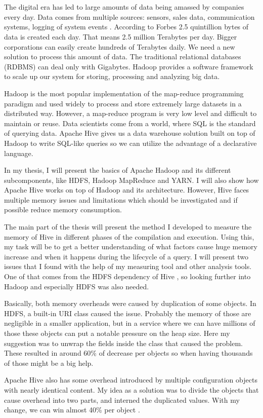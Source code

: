 \chapter{\bevezetes}

The digital era has led to large amounts of data being amassed by companies every day. Data comes from multiple sources: sensors, sales data, communication systems, logging of system events \etc. According to Forbes \cite{Forbes} 2.5 quintillion bytes of data is created each day. That means 2.5 million Terabytes per day. Bigger corporations can easily create hundreds of Terabytes daily. We need a new solution to process this amount of data. The traditional relational databases (RDBMS) can deal only with Gigabytes. Hadoop provides a software framework to scale up our system for storing, processing and analyzing big data.

Hadoop is the most popular implementation of the map-reduce programming paradigm and used widely to process and store extremely large datasets in a distributed way. However, a map-reduce program is very low level and difficult to maintain or reuse. Data scientists come from a world, where SQL is the standard of querying data. Apache Hive gives us a data warehouse solution built on top of Hadoop to write SQL-like queries so we can utilize the advantage of a declarative language.

In my thesis, I will present the basics of Apache Hadoop and its different subcomponents, like HDFS, Hadoop MapReduce and YARN. I will also show how Apache Hive works on top of Hadoop and its architecture. However, Hive faces multiple memory issues and limitations which should be investigated and if possible reduce memory consumption.

The main part of the thesis will present the method  I developed to measure the memory of Hive in different phases of the compilation and execution. Using this, my task will be to get a better understanding of what factors cause huge memory increase and when it happens during the lifecycle of a query. I will present two issues that I found with the help of my measuring tool and other analysis tools. One of that comes from the HDFS dependency of Hive \cite{hdfs-path}, so looking further into Hadoop and especially HDFS was also needed. 


Basically, both memory overheads were caused by duplication of some objects. In HDFS, a built-in URI class caused the issue. Probably the memory of those are negligible in a smaller application, but in a service where we can have millions of those these objects can put a notable pressure on the heap size. Here my suggestion was to unwrap the fields inside the class that caused the problem. These resulted in around 60\% of decrease per objects so when having thousands of those might be a big help.

Apache Hive also has some overhead introduced by multiple configuration objects with nearly identical content. My idea as a solution was to divide the objects that cause overhead into two parts, and interned the duplicated values. With my change, we can win almost 40\% per object \cite{hive-conf}.